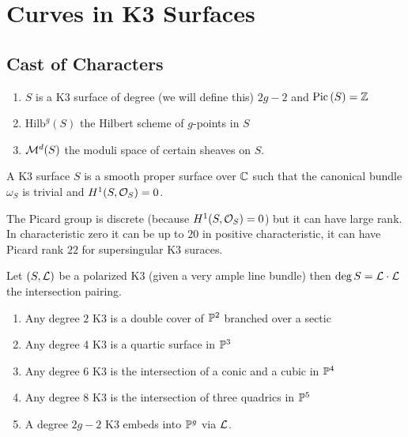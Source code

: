\documentclass[12pt]{article}
\begin{document}
\newcommand{\Hilb}{\mathrm{Hilb}}

\section{Curves in K3 Surfaces}

\subsection{Cast of Characters}

\begin{enumerate}
\item $S$ is a K3 surface of degree (we will define this) $2g-2$ and $\Pic{S}= \Z$
\item $\mathrm{Hilb}^g(S)$ the Hilbert scheme of $g$-points in $S$
\item $\M^d(S)$ the moduli space of certain sheaves on $S$.
\end{enumerate}

\begin{defn}
A K3 surface $S$ is a smooth proper surface over $\CC$ such that the canonical bundle $\omega_S$ is trivial and $H^1(S, \struct{S}) = 0$.
\end{defn}

\begin{rmk}
The Picard group is discrete (because $H^1(S, \struct{S}) = 0$) but it can have large rank. In characteristic zero it can be up to $20$ in positive characteristic, it can have Picard rank $22$ for supersingular K3 suraces.
\end{rmk}

\begin{defn}
Let $(S, \L)$ be a polarized K3 (given a very ample line bundle) then $\deg{S} = \L \cdot \L$ the intersection pairing. 
\end{defn}

\begin{example}
\begin{enumerate}
\item Any degree $2$ K3 is a double cover of $\P^2$ branched over a sectic
\item Any degree 4 K3 is a quartic surface in $\P^3$
\item Any degree 6 K3 is the intersection of a conic and a cubic in $\P^4$
\item Any degree 8 K3 is the intersection of three quadrics in $\P^5$
\item A degree $2g-2$ K3 embeds into $\P^g$ via $\L$.
\end{enumerate}
\end{example}
\end{document}
